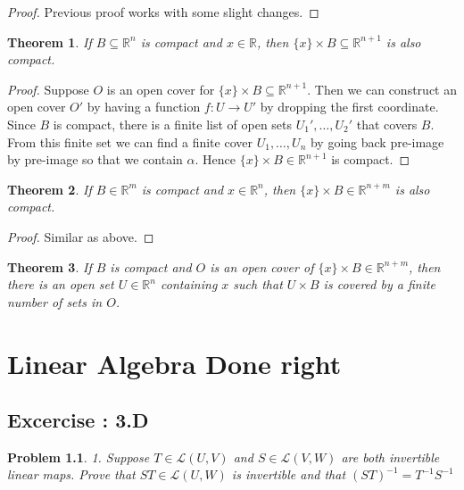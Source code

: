 \documentclass[12pt]{book}
\newtheorem{theorem}{Theorem}
\newtheorem*{problem*}{Problem}
\newcommand{\LL}{\mathcal{L}}
\begin{document}
\begin{proof}
  Previous proof works with some slight changes. 
\end{proof}

\begin{theorem}
If $B \subseteq \mathbb{R}^{n}$ is compact and $x \in \mathbb{R}$, then $\{x\}\times
B \subseteq \mathbb{R}^{n+1}$ is also compact.
\end{theorem}
\begin{proof}
Suppose $O$ is an open cover for $\{x\}\times B \subseteq \mathbb{R}^{n+1}$. Then we
can construct an open cover $O'$ by having a function $f:U \to U'$ by dropping
the first coordinate. Since $B$ is compact, there is a finite list of open sets
$U_1', \ldots, U_2'$ that covers $B$. From this finite set we can find a finite
cover $U_1, \ldots, U_n$ by going back pre-image by pre-image so that we contain
$\alpha$. Hence $\{x\}\times B \in \mathbb{R}^{n+1}$ is compact.
\end{proof}


\begin{theorem}
If $B \in \mathbb{R}^{m}$ is compact and $x \in \mathbb{R}^n$, then $\{x\}\times
B \in \mathbb{R}^{n+m}$ is also compact.
\end{theorem}

\begin{proof}
  Similar as above. 
\end{proof}

\begin{theorem}
If $B$ is compact and $O$ is an open cover of $\{x\}\times B \in
\mathbb{R}^{n+m}$, then there is an open set $U\in \mathbb{R}^n$ containing $x$
such that $U \times B$ is covered by a finite number of sets in $O$.
\end{theorem}



\chapter{Linear Algebra Done right}

\section{Excercise : 3.D}

\begin{problem*}
  1. Suppose $T \in \LL(U,V)$ and $ S \in \LL(V,W)$ are both invertible
  linear maps. Prove that $ST \in \LL(U,W)$ is invertible and that $(ST)^{-1} = T^{-1}S^{-1}$
\end{problem*}
\end{document}
